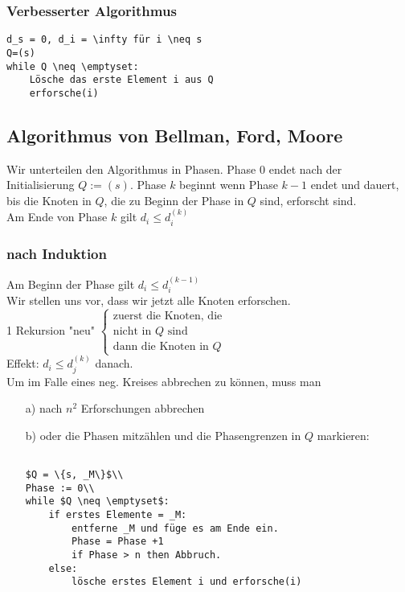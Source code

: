 \subsubsection{Verbesserter Algorithmus}
\begin{lstlisting}[mathescape]
d_s = 0, d_i = \infty für i \neq s
Q=(s)
while Q \neq \emptyset:
	Lösche das erste Element i aus Q
	erforsche(i)
\end{lstlisting}
\subsection{Algorithmus von Bellman, Ford, Moore}
Wir unterteilen den Algorithmus in Phasen.
Phase $0$ endet nach der Initialisierung $Q:=(s)$.
Phase $k$ beginnt wenn Phase $k-1$ endet und dauert, bis die Knoten in $Q$, die zu Beginn der Phase in $Q$ sind, erforscht sind.\\
Am Ende von Phase $k$ gilt $d_i \leq d_i^{(k)}$\\
\subsubsection*{nach Induktion}
Am Beginn der Phase gilt $d_i \leq d_i^{(k-1)}$\\
Wir stellen uns vor, dass wir jetzt alle Knoten erforschen.\\
1 Rekursion "neu" $\begin{cases} \text{zuerst die Knoten, die} \\\text{nicht in $Q$ sind}\\\text{dann die Knoten in }Q\end{cases}$\\
Effekt: $d_i\leq d_j^{(k)}$ danach.\\
Um im Falle eines neg. Kreises abbrechen zu können, muss man 
\begin{enumerate}
\item[a)] nach $n^2$ Erforschungen abbrechen
\item[b)] oder die Phasen mitzählen und die Phasengrenzen in $Q$ markieren:\\
\begin{lstlisting}

$Q = \{s, _M\}$\\
Phase := 0\\
while $Q \neq \emptyset$:
	if erstes Elemente = _M:
		entferne _M und füge es am Ende ein.
		Phase = Phase +1
		if Phase > n then Abbruch.
	else:
		lösche erstes Element i und erforsche(i)
\end{lstlisting}
\end{enumerate}
